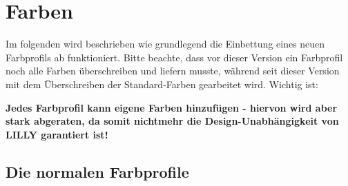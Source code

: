 \chapter[Farben \LILLYxBOXxVersion{\small 1.0.4}]{Farben}
{\centering {}\vspace*{0.5\baselineskip}\par}
Im folgenden wird beschrieben wie grundlegend die Einbettung eines neuen Farbprofils ab  funktioniert. Bitte beachte, dass vor dieser Version ein Farbprofil noch alle Farben überschreiben und liefern musste, während seit dieser Version mit dem Überschreiben der Standard-Farben gearbeitet wird. Wichtig ist:\begin{center}
    \small\bfseries Jedes Farbprofil kann eigene Farben hinzufügen - hiervon wird aber stark abgeraten, da somit nichtmehr die Design-Unabhängigkeit von LILLY garantiert ist!
\end{center}
\reversemarginpar
\section{Die normalen Farbprofile}
